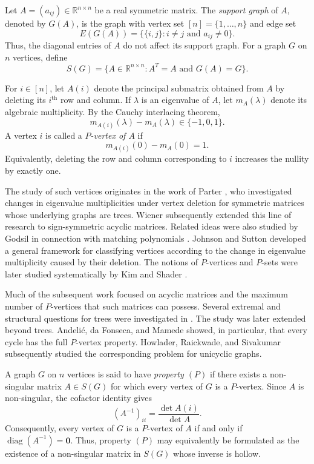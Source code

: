 \documentclass[12pt,reqno]{amsart}
\theoremstyle{plain}
\theoremstyle{definition}
\theoremstyle{block}
\theoremstyle{remark}
\numberwithin{equation}{section}
\begin{document}
Let \(A=(a_{ij})\in\mathbb{R}^{n\times n}\) be a real symmetric matrix.
The \emph{support graph} of \(A\), denoted by \(G(A)\), is the graph with
vertex set \([n]=\{1,\ldots,n\}\) and edge set
\[
E(G(A))
=
\bigl\{\{i,j\}:i\neq j \text{ and }a_{ij}\neq0\bigr\}.
\]
Thus, the diagonal entries of \(A\) do not affect its support graph. For
a graph \(G\) on \(n\) vertices, define
\[
S(G)
=
\bigl\{
A\in\mathbb{R}^{n\times n}:
A^{T}=A \text{ and }G(A)=G
\bigr\}.
\]

For \(i\in[n]\), let \(A(i)\) denote the principal submatrix obtained
from \(A\) by deleting its \(i^{\text{th}}\) row and column. If \(\lambda\) is an
eigenvalue of \(A\), let \(m_A(\lambda)\) denote its algebraic
multiplicity. By the Cauchy interlacing theorem,
\[
m_{A(i)}(\lambda)-m_A(\lambda)\in\{-1,0,1\}.
\]
A vertex \(i\) is called a \emph{\(P\)-vertex of \(A\)} if
\[
m_{A(i)}(0)-m_A(0)=1.
\]
Equivalently, deleting the row and column corresponding to \(i\)
increases the nullity by exactly one.

The study of such vertices originates in the work of Parter
\cite{Parter}, who investigated changes in eigenvalue multiplicities
under vertex deletion for symmetric matrices whose underlying graphs
are trees. Wiener \cite{wiener} subsequently extended this line of
research to sign-symmetric acyclic matrices. Related ideas were also
studied by Godsil in connection with matching polynomials
\cite{godsil}. Johnson and Sutton \cite{hermitian} developed a general
framework for classifying vertices according to the change in
eigenvalue multiplicity caused by their deletion. The notions of
\(P\)-vertices and \(P\)-sets were later studied systematically by Kim
and Shader \cite{kim1,kim2}.

Much of the subsequent work focused on acyclic matrices and the
maximum number of \(P\)-vertices that such matrices can possess.
Several extremal and structural questions for trees were investigated
in \cite{fons1,fons2,fons5,du2}. The study was later extended beyond
trees. Andeli\'c, da Fonseca, and Mamede \cite{fons1} showed, in
particular, that every cycle has the full \(P\)-vertex property.
Howlader, Raickwade, and Sivakumar \cite{Howlader} subsequently studied
the corresponding problem for unicyclic graphs.

A graph \(G\) on \(n\) vertices is said to have \emph{property
\((P)\)} if there exists a non-singular matrix \(A\in S(G)\) for which
every vertex of \(G\) is a \(P\)-vertex. Since \(A\) is non-singular,
the cofactor identity gives
\[
(A^{-1})_{ii}
=
\frac{\det A(i)}{\det A}.
\]
Consequently, every vertex of \(G\) is a \(P\)-vertex of \(A\) if and
only if
\(
\operatorname{diag}(A^{-1})=\mathbf 0.
\)
Thus, property \((P)\) may equivalently be formulated as the existence
of a non-singular matrix in \(S(G)\) whose inverse is hollow.
\end{document}
